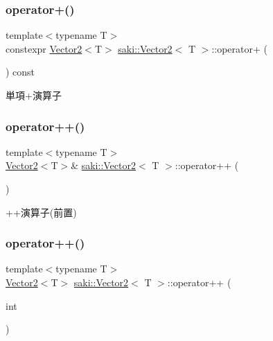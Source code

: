 \subsubsection{\texorpdfstring{operator+()}{operator+()}}
{\footnotesize\ttfamily template$<$typename T$>$ \\
constexpr \mbox{\hyperlink{classsaki_1_1_vector2}{Vector2}}$<$T$>$ \mbox{\hyperlink{classsaki_1_1_vector2}{saki\+::\+Vector2}}$<$ T $>$\+::operator+ (\begin{DoxyParamCaption}{ }\end{DoxyParamCaption}) const\hspace{0.3cm}{\ttfamily [inline]}}



単項+演算子 

\mbox{\label{classsaki_1_1_vector2_a3725de8861259fa53da14e6c1b6ceb11}} 
\subsubsection{\texorpdfstring{operator++()}{operator++()}\hspace{0.1cm}{\footnotesize\ttfamily [1/2]}}
{\footnotesize\ttfamily template$<$typename T$>$ \\
\mbox{\hyperlink{classsaki_1_1_vector2}{Vector2}}$<$T$>$\& \mbox{\hyperlink{classsaki_1_1_vector2}{saki\+::\+Vector2}}$<$ T $>$\+::operator++ (\begin{DoxyParamCaption}{ }\end{DoxyParamCaption})\hspace{0.3cm}{\ttfamily [inline]}}



++演算子(前置) 

\mbox{\label{classsaki_1_1_vector2_a114fe4d9b2b56c3d016910b8657e6720}} 
\subsubsection{\texorpdfstring{operator++()}{operator++()}\hspace{0.1cm}{\footnotesize\ttfamily [2/2]}}
{\footnotesize\ttfamily template$<$typename T$>$ \\
\mbox{\hyperlink{classsaki_1_1_vector2}{Vector2}}$<$T$>$ \mbox{\hyperlink{classsaki_1_1_vector2}{saki\+::\+Vector2}}$<$ T $>$\+::operator++ (\begin{DoxyParamCaption}\item[{int}]{ }\end{DoxyParamCaption})\hspace{0.3cm}{\ttfamily [inline]}}



